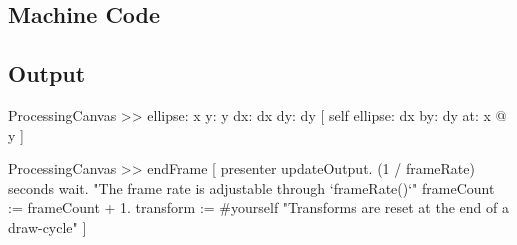 \subsection{Machine Code}
\subsection{Output}


\begin{code}
ProcessingCanvas >> ellipse: x y: y dx: dx dy: dy [
	self
		ellipse: dx
		by: dy
		at: x @ y
]
\end{code}


\begin{code}
ProcessingCanvas >> endFrame [
	presenter updateOutput.
	(1 / frameRate) seconds wait.	"The frame rate is adjustable through `frameRate()`"
	frameCount := frameCount + 1.
	transform := #yourself	"Transforms are reset at the end of a draw-cycle"
]
\end{code}
